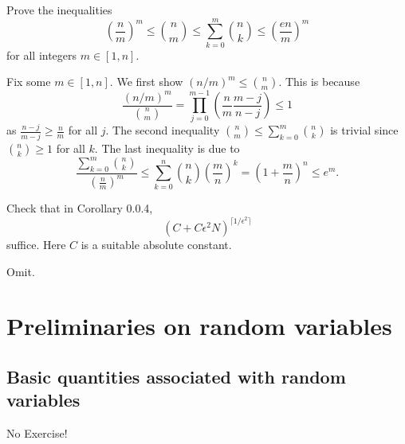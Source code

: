 \begin{problem*}[Exercise 0.0.5]\label{ex0.0.5}
	Prove the inequalities
	\[
		\left( \frac{n}{m} \right) ^m
		\leq \binom{n}{m}
		\leq \sum_{k=0}^{m} \binom{n}{k}
		\leq \left( \frac{en}{m} \right) ^m
	\]
	for all integers \(m \in [1, n]\).
\end{problem*}
\begin{answer}
	Fix some \(m\in [1, n]\). We first show \((n / m)^m \leq \binom{n}{m}\). This is because
	\[
		\frac{(n / m)^m}{\binom{n}{m}}
		= \prod_{j=0}^{m-1} \left( \frac{n}{m} \frac{m-j}{n-j} \right)
		\leq 1
	\]
	as \(\frac{n-j}{m-j} \geq \frac{n}{m}\) for all \(j\). The second inequality \(\binom{n}{m} \leq \sum_{k=0}^{m} \binom{n}{k}\) is trivial since \(\binom{n}{k} \geq 1\) for all \(k\). The last inequality is due to
	\[
		\frac{\sum_{k=0}^{m} \binom{n}{k}}{\left( \frac{n}{m} \right) ^m}
		\leq \sum_{k=0}^{n} \binom{n}{k} \left( \frac{m}{n} \right) ^k
		= \left( 1 + \frac{m}{n} \right) ^n
		\leq e^m.
	\]
\end{answer}

\begin{problem*}[Exercise 0.0.6]\label{ex0.0.6}
	Check that in Corollary 0.0.4,
	\[
		(C + C \epsilon ^2 N)^{\lceil 1 / \epsilon ^2 \rceil }
	\]
	suffice. Here \(C\) is a suitable absolute constant.
\end{problem*}
\begin{answer}
	Omit.
\end{answer}

\chapter{Preliminaries on random variables}
\section{Basic quantities associated with random variables}
No Exercise!

